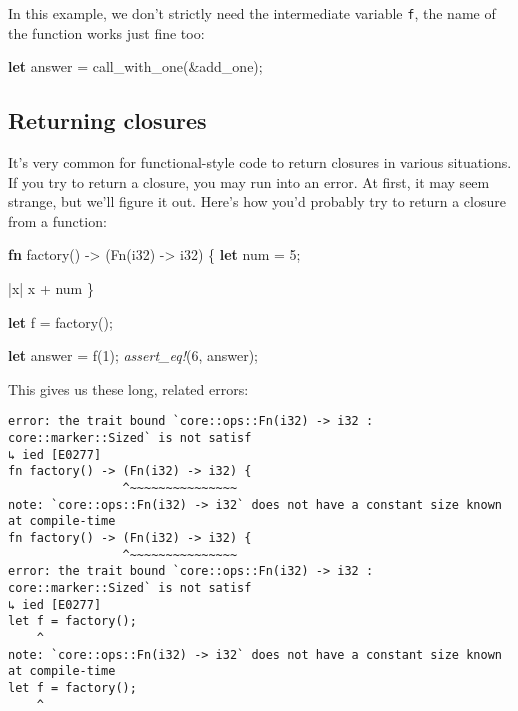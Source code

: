 \documentclass[a4paper,]{book}
\newenvironment{Shaded}{\begin{snugshade}}{\end{snugshade}}
\newcommand{\KeywordTok}[1]{\textcolor[rgb]{0.13,0.29,0.53}{\textbf{{#1}}}}
\newcommand{\DataTypeTok}[1]{\textcolor[rgb]{0.13,0.29,0.53}{{#1}}}
\newcommand{\DecValTok}[1]{\textcolor[rgb]{0.00,0.00,0.81}{{#1}}}
\newcommand{\BuiltInTok}[1]{{#1}}
\newcommand{\PreprocessorTok}[1]{\textcolor[rgb]{0.56,0.35,0.01}{\textit{{#1}}}}
\newcommand{\NormalTok}[1]{{#1}}
\begin{document}
In this example, we don't strictly need the intermediate variable
\texttt{f}, the name of the function works just fine too:

\begin{Shaded}
\begin{Highlighting}[]
\KeywordTok{let} \NormalTok{answer = call_with_one(&add_one);}
\end{Highlighting}
\end{Shaded}

\subsection{Returning closures}\label{returning-closures}

It's very common for functional-style code to return closures in various
situations. If you try to return a closure, you may run into an error.
At first, it may seem strange, but we'll figure it out. Here's how you'd
probably try to return a closure from a function:

\begin{Shaded}
\begin{Highlighting}[]
\KeywordTok{fn} \NormalTok{factory() -> (}\BuiltInTok{Fn}\NormalTok{(}\DataTypeTok{i32}\NormalTok{) -> }\DataTypeTok{i32}\NormalTok{) \{}
    \KeywordTok{let} \NormalTok{num = }\DecValTok{5}\NormalTok{;}

    \NormalTok{|x| x + num}
\NormalTok{\}}

\KeywordTok{let} \NormalTok{f = factory();}

\KeywordTok{let} \NormalTok{answer = f(}\DecValTok{1}\NormalTok{);}
\PreprocessorTok{assert_eq!}\NormalTok{(}\DecValTok{6}\NormalTok{, answer);}
\end{Highlighting}
\end{Shaded}

This gives us these long, related errors:

\begin{verbatim}
error: the trait bound `core::ops::Fn(i32) -> i32 : core::marker::Sized` is not satisf
↳ ied [E0277]
fn factory() -> (Fn(i32) -> i32) {
                ^~~~~~~~~~~~~~~~
note: `core::ops::Fn(i32) -> i32` does not have a constant size known at compile-time
fn factory() -> (Fn(i32) -> i32) {
                ^~~~~~~~~~~~~~~~
error: the trait bound `core::ops::Fn(i32) -> i32 : core::marker::Sized` is not satisf
↳ ied [E0277]
let f = factory();
    ^
note: `core::ops::Fn(i32) -> i32` does not have a constant size known at compile-time
let f = factory();
    ^
\end{verbatim}
\end{document}
